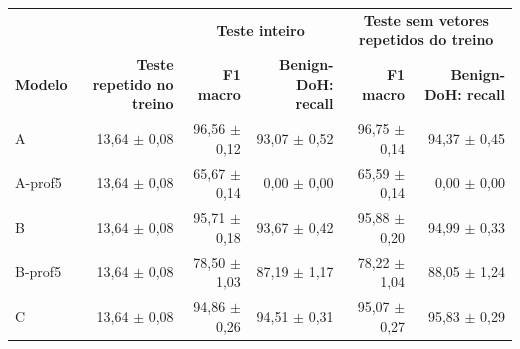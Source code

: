 \begin{tabular}{lrrrrr}
\hline
\multicolumn{2}{c}{\textbf{}} & \multicolumn{2}{c}{\textbf{Teste inteiro}} & \multicolumn{2}{c}{\textbf{Teste sem vetores repetidos do treino}} \\
\textbf{Modelo} & \textbf{Teste repetido no treino} & \textbf{F1 macro} & \textbf{Benign-DoH: recall} & \textbf{F1 macro} & \textbf{Benign-DoH: recall} \\ \hline
A & 13,64 $\pm$ 0,08 & 96,56 $\pm$ 0,12 & 93,07 $\pm$ 0,52 & 96,75 $\pm$ 0,14 & 94,37 $\pm$ 0,45 \\
A-prof5 & 13,64 $\pm$ 0,08 & 65,67 $\pm$ 0,14 & 0,00 $\pm$ 0,00 & 65,59 $\pm$ 0,14 & 0,00 $\pm$ 0,00 \\
B & 13,64 $\pm$ 0,08 & 95,71 $\pm$ 0,18 & 93,67 $\pm$ 0,42 & 95,88 $\pm$ 0,20 & 94,99 $\pm$ 0,33 \\
B-prof5 & 13,64 $\pm$ 0,08 & 78,50 $\pm$ 1,03 & 87,19 $\pm$ 1,17 & 78,22 $\pm$ 1,04 & 88,05 $\pm$ 1,24 \\
C & 13,64 $\pm$ 0,08 & 94,86 $\pm$ 0,26 & 94,51 $\pm$ 0,31 & 95,07 $\pm$ 0,27 & 95,83 $\pm$ 0,29 \\
\hline
\end{tabular}
